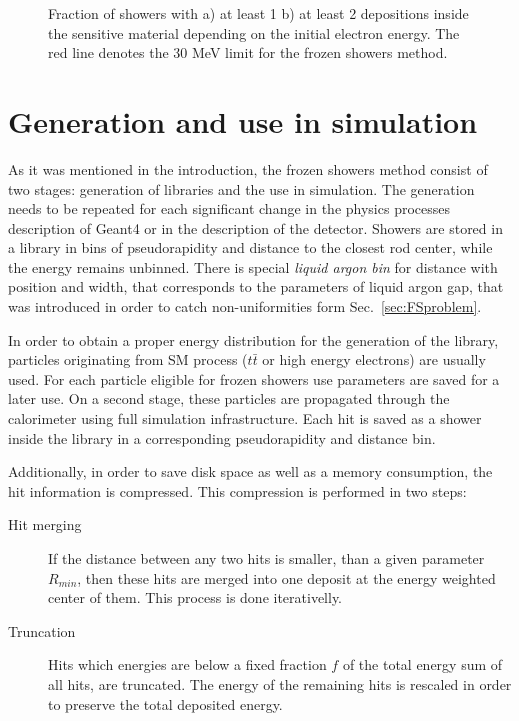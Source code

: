 \begin{figure}[!tbp]
\begin{minipage}[h]{0.49\linewidth}
\end{minipage}
\hfill
\begin{minipage}[h]{0.49\linewidth}
\end{minipage}
\caption{Fraction of showers with a) at least 1 b) at least 2 depositions inside the sensitive material depending on the initial electron energy. The red line denotes the 30 MeV limit for the frozen showers method.}
\label{fig:fracHits}
\end{figure}


\section{Generation and use in simulation}\label{sec:FSProdUse}

As it was mentioned in the introduction, the frozen showers method consist of two stages: generation of libraries and the use in simulation. The generation needs to be repeated for each significant change in the physics processes description of Geant4 or in the description of the detector. Showers are stored in a library in bins of pseudorapidity and distance to the closest rod center, while the energy remains unbinned. There is special \textit{liquid argon bin} for distance with position and width, that corresponds to the parameters of liquid argon gap, that was introduced in order to catch non-uniformities form Sec.~\ref{sec:FSproblem}.

In order to obtain a proper energy distribution for the generation of the library, particles originating from SM process ($t\bar{t}$ or high energy electrons) are usually used. For each particle eligible for frozen showers use parameters are saved for a later use. On a second stage, these particles are propagated through the calorimeter using full \atlas simulation infrastructure. Each hit is saved as a shower inside the library in a corresponding pseudorapidity and distance bin. 

Additionally, in order to save disk space as well as a memory consumption, the hit information is compressed. This compression is performed in two steps: 
\begin{description}
\item [Hit merging] If the distance between any two hits is smaller, than a given parameter $R_{min}$, then these hits are merged into one deposit at the energy weighted center of them. This process is done iterativelly.
\item [Truncation] Hits which energies are below a fixed fraction $f$ of the total energy sum of all hits, are truncated. The energy of the remaining hits is rescaled in order to preserve the total deposited energy.
\end{description}

